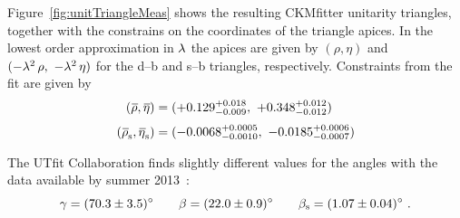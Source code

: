 Figure~\ref{fig:unitTriangleMeas} shows the resulting CKMfitter unitarity triangles, together with the constrains on the coordinates
of the triangle apices. In the lowest order approximation in $\lambda$ the apices are given by $(\rho, \eta)$ and $(-\lambda^2\,\rho,\
-\lambda^2\,\eta)$ for the d--b and s--b triangles, respectively. Constraints from the fit are given by
\begin{equation}
  \label{eq:CKMApicesCKMf}
  \begin{aligned}
    (\rhobar, \etabar)   &= (+0.129^{+0.018}_{-0.009},\ +0.348^{+0.012}_{-0.012}) \\[0.3em]
    (\rhosbar, \etasbar) &= (-0.0068^{+0.0005}_{-0.0010},\ -0.0185^{+0.0006}_{-0.0007})
  \end{aligned}
\end{equation}

The UTfit Collaboration finds slightly different values for the angles with the data available by summer 2013~\cite{Bona:2005vz}:
\begin{equation}
  \label{eq:CKMAnglesUTf}
  \gamma = (70.3\pm3.5)^\circ \qquad \beta = (22.0\pm0.9)^\circ \qquad \beta_\text{s} = (1.07\pm0.04)^\circ
  \ .
\end{equation}

